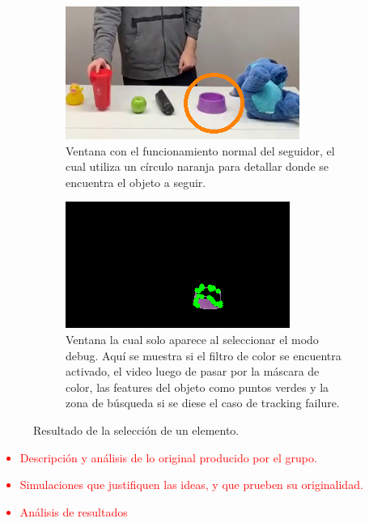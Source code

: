 \begin{figure}[]
\centering
	\begin{subfigure}{.4\textwidth}
		\centering
		\includegraphics[width=\textwidth]{Imagenes/Optical1.png}
		\caption{Ventana con el funcionamiento normal del seguidor, el cual utiliza un círculo naranja para detallar donde se encuentra el objeto a seguir.}
		\label{fig:optical1}
	\end{subfigure}
	\begin{subfigure}{.4\textwidth}
		\centering
		\includegraphics[width=\textwidth]{Imagenes/Optical2.png}
		\caption{Ventana la cual solo aparece al seleccionar el modo debug. Aquí se muestra si el filtro de color se encuentra activado, el video luego de pasar por la máscara de color, las features del objeto como puntos verdes y la zona de búsqueda si se diese el caso de tracking failure.}
		\label{fig:optical2}
	\end{subfigure}
	\caption{Resultado de la selección de un elemento.}
	\label{fig:optical12}
\end{figure}


\textcolor{red}{
\begin{itemize}
	\item Descripción y análisis de lo original producido por el grupo.
	\item Simulaciones que justifiquen las ideas, y que prueben su originalidad.
	\item Análisis de resultados
\end{itemize}
}

